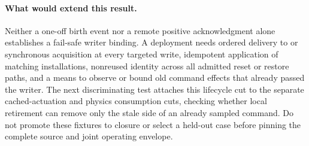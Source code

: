 \documentclass{article}
\begin{document}
\paragraph{What would extend this result.}
Neither a one-off birth event nor a remote positive acknowledgment alone establishes a fail-safe writer binding. A deployment needs ordered delivery to or synchronous acquisition at every targeted write, idempotent application of matching installations, nonreused identity across all admitted reset or restore paths, and a means to observe or bound old command effects that already passed the writer. The next discriminating test attaches this lifecycle cut to the separate cached-actuation and physics consumption cuts, checking whether local retirement can remove only the stale side of an already sampled command. Do not promote these fixtures to closure or select a held-out case before pinning the complete source and joint operating envelope.
\end{document}
